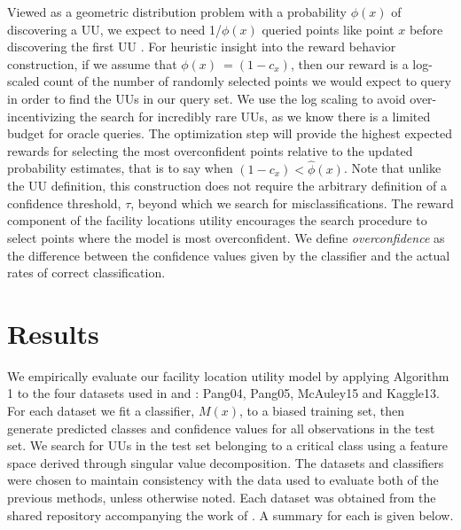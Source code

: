 \documentclass[letterpaper]{article} %
\begin{document}
Viewed as a geometric distribution problem with a probability $\phi(x)$ of discovering a UU, we expect to need 1/$\phi(x)$ queried points like point $x$ before discovering the first UU \citep{casella2002statistical}.  For heuristic insight into the reward behavior construction, if we assume that   $\phi(x) ~= (1-c_x )$, then our reward is a log-scaled count of the number of randomly selected points we would expect to query in order to find the UUs in our query set. We use the log scaling to avoid over-incentivizing the search for incredibly rare UUs, as we know there is a limited budget for oracle queries. The optimization step will provide the highest expected rewards for selecting the most overconfident points relative to the updated probability estimates, that is to say when $(1-c_x )< \hat{\phi}(x)$. Note that unlike the UU definition, this construction does not require the arbitrary definition of a confidence threshold, $\tau$, beyond which we search for misclassifications. The reward component of the facility locations utility encourages the search procedure to select points where the model is most overconfident. We define \textit{overconfidence} as the difference between the confidence values given by the classifier and the actual rates of correct classification.



\section{Results}

We empirically evaluate our facility location utility model by applying Algorithm 1 to the four datasets used in \cite{Lakkaraju2016} and \cite{Bansal2018}: Pang04, Pang05, McAuley15 and Kaggle13.  For each dataset we fit a classifier, $M(x)$, to a biased training set, then generate predicted classes and confidence values for all observations in the test set.  We search for UUs in the test set belonging to a critical class using a feature space derived through singular value decomposition.  The datasets and classifiers were chosen to maintain consistency with the data used to evaluate both of the previous methods, unless otherwise noted.  Each dataset was obtained from the shared repository accompanying the work of \cite{Bansal2018}.  A summary for each is given below.    
\end{document}
